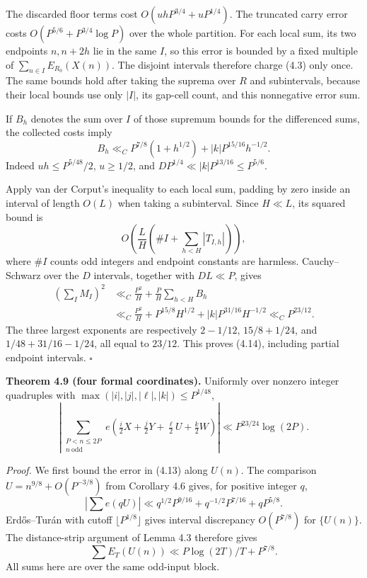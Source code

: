 \documentclass[11pt,a4paper]{article}
\begin{document}
The discarded floor terms cost \(O(uhP^{3/4}+uP^{1/4})\). The truncated
carry error costs \(O(P^{5/6}+P^{3/4}\log P)\) over the whole partition.
For each local sum, its two endpoints \(n,n+2h\) lie in the same \(I\),
so this error is bounded by a fixed multiple of
\(\sum_{n\in I}E_{R_0}(X(n))\). The disjoint intervals therefore charge
(4.3) only once. The same bounds hold after taking the suprema over
\(R\) and subintervals, because their local bounds use only \(|I|\), its
gap-cell count, and this nonnegative error sum.

If \(B_h\) denotes the sum over \(I\) of those supremum bounds for the
differenced sums, the collected costs imply \[
B_h\ll_C P^{7/8}(1+h^{1/2})
+|k|P^{15/16}h^{-1/2}.
\tag{4.15}
\] Indeed \(uh\le P^{5/48}/2\), \(u\ge1/2\), and
\(DP^{1/4}\ll |k|P^{13/16}\le P^{5/6}\).

Apply van der Corput's inequality to each local sum, padding by zero
inside an interval of length \(O(L)\) when taking a subinterval. Since
\(H\ll L\), its squared bound is \[
O\left(\frac LH\left(\#I+\sum_{h<H}|T_{I,h}|\right)\right),
\] where \(\#I\) counts odd integers and endpoint constants are
harmless. Cauchy--Schwarz over the \(D\) intervals, together with
\(DL\ll P\), gives \[
\begin{split}
\left(\sum_I M_I\right)^2
&\ll_C \frac{P^2}{H}+\frac P H\sum_{h<H}B_h\\
&\ll_C \frac{P^2}{H}+P^{15/8}H^{1/2}
+|k|P^{31/16}H^{-1/2}
\ll_C P^{23/12}.
\end{split}
\] The three largest exponents are respectively \(2-1/12\),
\(15/8+1/24\), and \(1/48+31/16-1/24\), all equal to \(23/12\). This
proves (4.14), including partial endpoint intervals. \(\square\)


\textbf{Theorem 4.9 (four formal coordinates).} Uniformly over nonzero
integer quadruples with \(\max(|i|,|j|,|\ell|,|k|)\le P^{1/48}\), \[
\left|\sum_{\substack{P<n\le2P\\n\ \mathrm{odd}}}
e\left(\tfrac i2X+\tfrac j2Y+\tfrac\ell2U+\tfrac k2W\right)\right|
\ll P^{23/24}\log(2P).
\tag{4.16}
\]

\emph{Proof.} We first bound the error in (4.13) along \(U(n)\). The
comparison \(U=n^{9/8}+O(P^{-3/8})\) from Corollary 4.6 gives, for
positive integer \(q\), \[
\left|\sum e(qU)\right|
\ll q^{1/2}P^{9/16}+q^{-1/2}P^{7/16}+qP^{5/8}.
\] Erd\H{o}s--Tur\'{a}n with cutoff \(\lfloor P^{1/8}\rfloor\) gives
interval discrepancy \(O(P^{7/8})\) for \(\{U(n)\}\). The distance-strip
argument of Lemma 4.3 therefore gives \[
\sum E_T(U(n))\ll P\log(2T)/T+P^{7/8}.
\tag{4.17}
\] All sums here are over the same odd-input block.
\end{document}
